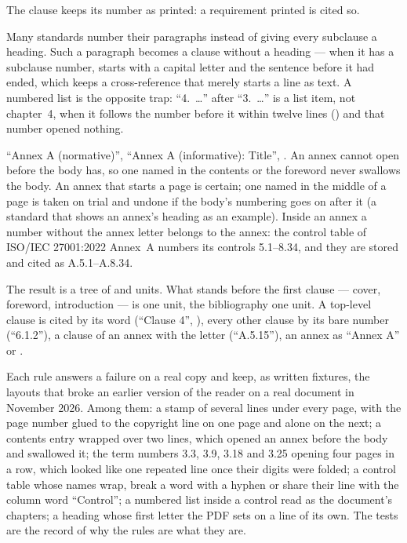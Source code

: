 \begin{description}
    The clause keeps its number as printed: a requirement printed  is cited
    so.
  \item[Numbered paragraphs and lists.] Many standards number their paragraphs instead of
    giving every subclause a heading. Such a paragraph becomes a clause without a heading ---
    when it has a subclause number, starts with a capital letter and the sentence before it
    had ended, which keeps a cross-reference that merely starts a line as text. A numbered
    list is the opposite trap: \enquote{4.~…} after \enquote{3.~…} is a list item, not
    chapter~4, when it follows the number before it within twelve lines
    () and that number opened nothing.
  \item[Annexes.] \enquote{Annex A (normative)}, \enquote{Annex A (informative): Title},
    . An annex cannot open before the body has, so one named in the
    contents or the foreword never swallows the body. An annex that starts a page is certain;
    one named in the middle of a page is taken on trial and undone if the body's numbering
    goes on after it (a standard that shows an annex's heading as an example). Inside an
    annex a number without the annex letter belongs to the annex: the control table of
    ISO/IEC 27001:2022 Annex~A numbers its controls 5.1–8.34, and they are stored and cited
    as A.5.1–A.8.34.
\end{description}

The result is a tree of  and  units. What stands before the first
clause --- cover, foreword, introduction --- is one  unit, the bibliography one
 unit. A top-level clause is cited by its word (\enquote{Clause 4},
), every other clause by its bare number (\enquote{6.1.2}), a clause of an annex
with the letter (\enquote{A.5.15}), an annex as \enquote{Annex A} or .

\begin{lessonbox}{Each rule answers a failure on a real copy}
 and  keep, as
written fixtures, the layouts that broke an earlier version of the reader on a real document
in November 2026. Among them: a stamp of several lines under every page, with the page number
glued to the copyright line on one page and alone on the next; a contents entry wrapped over
two lines, which opened an annex before the body and swallowed it; the term numbers 3.3, 3.9,
3.18 and 3.25 opening four pages in a row, which looked like one repeated line once their
digits were folded; a control table whose names wrap, break a word with a hyphen or share
their line with the column word \enquote{Control}; a numbered list inside a control read as
the document's chapters; a heading whose first letter the PDF sets on a line of its own. The
tests are the record of why the rules are what they are.
\end{lessonbox}

